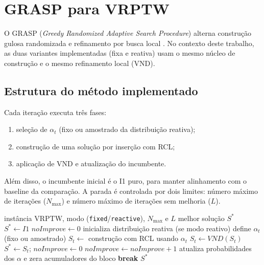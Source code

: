 \section{GRASP para VRPTW}
\label{sec:grasp}

O GRASP (\emph{Greedy Randomized Adaptive Search Procedure}) alterna construção gulosa randomizada e refinamento por busca local \cite{feo1995greedy,resende2003greedy}.
No contexto deste trabalho, as duas variantes implementadas (fixa e reativa) usam o mesmo núcleo de construção e o mesmo refinamento local (VND).

\subsection{Estrutura do método implementado}

Cada iteração executa três fases:
\begin{enumerate}
  \item seleção de $\alpha_t$ (fixo ou amostrado da distribuição reativa);
  \item construção de uma solução por inserção com RCL;
  \item aplicação de VND e atualização do incumbente.
\end{enumerate}

Além disso, o incumbente inicial é o I1 puro, para manter alinhamento com o baseline da comparação.
A parada é controlada por dois limites: número máximo de iterações ($N_{\max}$) e número máximo de iterações sem melhoria ($L$).

\begin{algorithm}[htbp]
\caption{GRASP (fixo e reativo) com VND}
\label{alg:grasp}
\begin{algorithmic}[1]
\Require instância VRPTW, modo (\texttt{fixed}/\texttt{reactive}), $N_{\max}$ e $L$
\Ensure melhor solução $S^*$
\State $S^* \leftarrow I1$
\State $noImprove \leftarrow 0$
\State inicializa distribuição reativa (se modo reativo)
  \State define $\alpha_t$ (fixo ou amostrado)
  \State $S_t \leftarrow$ construção com RCL usando $\alpha_t$
    \State $S_t \leftarrow VND(S_t)$
  \EndIf
    \State $S^* \leftarrow S_t$; $noImprove \leftarrow 0$
  \Else
    \State $noImprove \leftarrow noImprove + 1$
  \EndIf
    \State atualiza probabilidades dos $\alpha$ e zera acumuladores do bloco
  \EndIf
    \State \textbf{break}
  \EndIf
\EndFor
\State \Return $S^*$
\end{algorithmic}
\end{algorithm}

